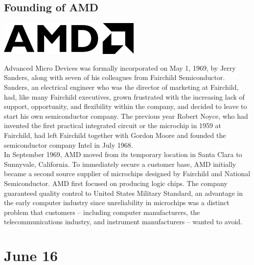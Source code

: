 \documentclass[11pt]{report}
\begin{document}
\subsection{Founding of AMD}
\vspace{2mm}\begin{center}\includegraphics[width=7cm]{./img/amdLogo.jpg}\end{center}
Advanced Micro Devices was formally incorporated on May 1, 1969, by Jerry Sanders, along with seven of his colleagues from Fairchild Semiconductor. Sanders, an electrical engineer who was the director of marketing at Fairchild, had, like many Fairchild executives, grown frustrated with the increasing lack of support, opportunity, and flexibility within the company, and decided to leave to start his own semiconductor company. The previous year Robert Noyce, who had invented the first practical integrated circuit or the microchip in 1959 at Fairchild, had left Fairchild together with Gordon Moore and founded the semiconductor company Intel in July 1968.\\
\indent In September 1969, AMD moved from its temporary location in Santa Clara to Sunnyvale, California. To immediately secure a customer base, AMD initially became a second source supplier of microchips designed by Fairchild and National Semiconductor. AMD first focused on producing logic chips. The company guaranteed quality control to United States Military Standard, an advantage in the early computer industry since unreliability in microchips was a distinct problem that customers – including computer manufacturers, the telecommunications industry, and instrument manufacturers – wanted to avoid.
\section{June 16}
\end{document}
